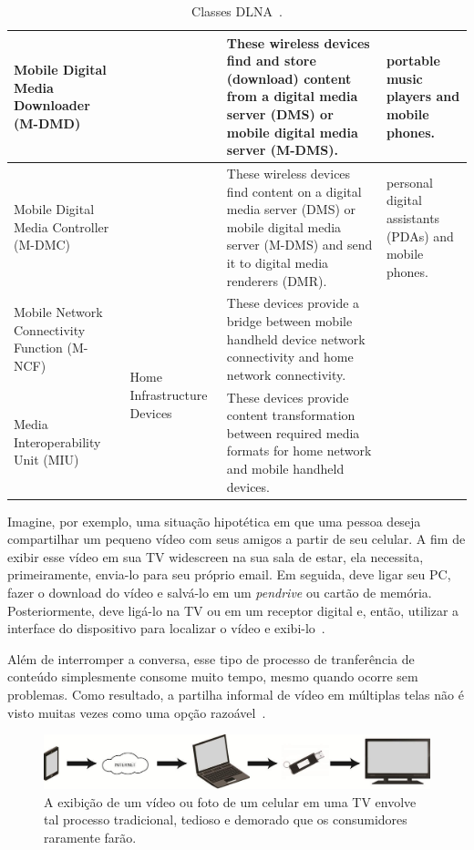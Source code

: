 \begin{table}
\begin{center}
\begin{tabular}{llll}
		\hline
		Mobile Digital Media Downloader (M-DMD) & & These wireless devices find and store (download) content from a digital media server (DMS) or mobile digital media server (M-DMS). & portable music players and mobile phones.\\
		\hline
		Mobile Digital Media Controller (M-DMC) & & These wireless devices find content on a digital media server (DMS) or mobile digital media server (M-DMS) and send it to digital media renderers (DMR). & personal digital assistants (PDAs) and mobile phones.\\
		\hline
		Mobile Network Connectivity Function (M-NCF) & \multirow{2}{*}{Home Infrastructure Devices} & These devices provide a bridge between mobile handheld device network connectivity and home network connectivity. & \\
		\hline
		Media Interoperability Unit (MIU) & & These devices provide content transformation between required media formats for home network and mobile handheld devices. & \\
		\hline
		\end{tabular}
	\end{center}
	\caption{Classes DLNA~\cite{dlnaclasses}.}
	\label{tab:classes_dlna}
\end{table}

Imagine, por exemplo, uma situação hipotética em que uma pessoa deseja compartilhar um pequeno vídeo com seus amigos a partir de seu celular. A fim de exibir esse vídeo em sua TV widescreen na sua sala de estar, ela necessita, primeiramente, envia-lo para seu próprio email. Em seguida, deve ligar seu PC, fazer o download do vídeo e salvá-lo em um \emph{pendrive} ou cartão de memória. Posteriormente, deve ligá-lo na TV ou em um receptor digital e, então, utilizar a interface do dispositivo para localizar o vídeo e exibi-lo~\cite{dlnahdvideostreaming}.

Além de interromper a conversa, esse tipo de processo de tranferência de conteúdo simplesmente consome muito tempo, mesmo quando ocorre sem problemas. Como resultado, a partilha informal de vídeo em múltiplas telas não é visto muitas vezes como uma opção razoável~\cite{dlnahdvideostreaming}.

\begin{figure}[ht]
	\center
	\includegraphics[scale=0.3]{imagens/dlna1}
	\caption{A exibição de um vídeo ou foto de um celular em uma TV envolve tal processo tradicional, tedioso e demorado que os consumidores raramente farão.}
	\label{fig:traditionalProccess}
\end{figure}


